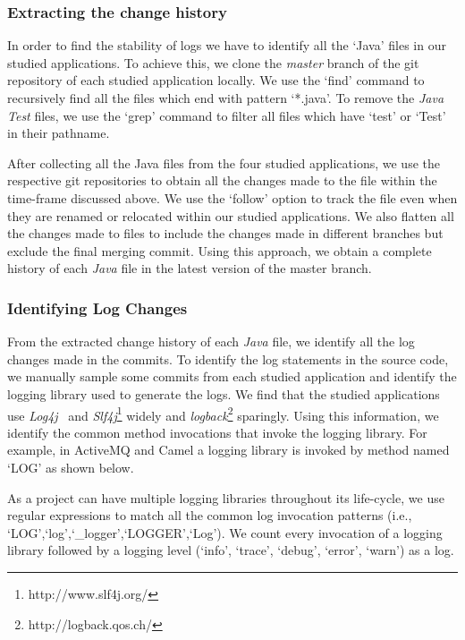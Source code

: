 \subsubsection{Extracting the change history }
In order to find the stability of logs we have to identify all the `Java' files in our studied applications. To achieve this, we clone the \emph{master} branch of the git repository of each studied application locally. We use the `find' command to recursively find all the files which end with pattern `*.java'. To remove the \textsl{Java Test} files, we use the `grep' command to filter all files which have `test' or `Test' in their pathname.

 After collecting all the Java files from the four studied applications, we use the respective git repositories to obtain all the changes made to the file within the time-frame discussed above. We use the `follow' option to track the file even when they are renamed or relocated within our studied applications. We also flatten all the changes made to files to include the changes made in different branches but exclude the final merging commit. Using this approach, we obtain a complete history of each \emph{Java} file in the latest version of the master branch.

\subsubsection{Identifying Log Changes}
From the extracted change history of each \emph{Java} file, we identify all the log changes made in the commits. To identify the log statements in the source code, we manually sample some commits from each studied application and identify the logging library used to generate the logs. We find that the studied applications use \textsl{Log4j}~\cite{EMSEIAN} and \textsl{Slf4j}\footnote{http://www.slf4j.org/} widely and \textsl{logback}\footnote{http://logback.qos.ch/} sparingly. Using this information, we identify the common method invocations that invoke the logging library. For example, in  ActiveMQ and Camel a logging library is invoked by method named `LOG' as shown below.

%

As a project can have multiple logging libraries throughout its life-cycle, we use regular expressions to match all the common log invocation patterns (i.e., `LOG',`log',`\_logger',`LOGGER',`Log'). We count every invocation of a logging library followed by a logging level (`info', `trace', `debug', `error', `warn') as a log.


